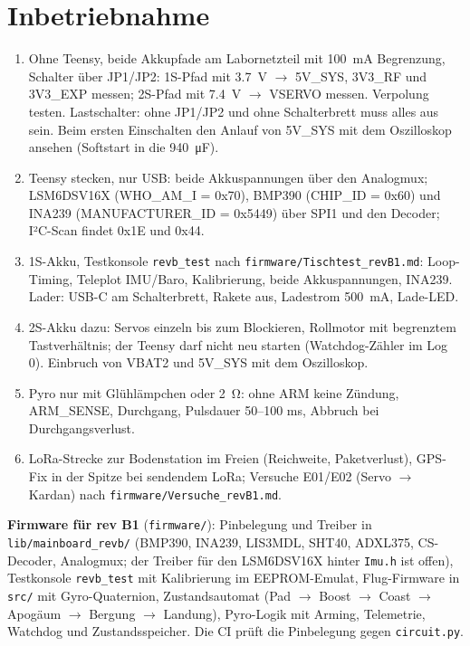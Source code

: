 \documentclass[10pt,a4paper,twoside]{article}
\begin{document}
\section{Inbetriebnahme}
\begin{enumerate}
  \item Ohne Teensy, beide Akkupfade am Labornetzteil mit \SI{100}{mA} Begrenzung, Schalter über JP1/JP2: 1S-Pfad mit \SI{3.7}{V} $\to$ 5V\_SYS, 3V3\_RF und 3V3\_EXP messen; 2S-Pfad mit \SI{7.4}{V} $\to$ VSERVO messen. Verpolung testen. Lastschalter: ohne JP1/JP2 und ohne Schalterbrett muss alles aus sein. Beim ersten Einschalten den Anlauf von 5V\_SYS mit dem Oszilloskop ansehen (Softstart in die \SI{940}{\micro F}).
  \item Teensy stecken, nur USB: beide Akkuspannungen über den Analogmux; LSM6DSV16X (WHO\_AM\_I = 0x70), BMP390 (CHIP\_ID = 0x60) und INA239 (MANUFACTURER\_ID = 0x5449) über SPI1 und den Decoder; I²C-Scan findet 0x1E und 0x44.
  \item 1S-Akku, Testkonsole \texttt{revb\_test} nach \texttt{firmware/Tischtest\_revB1.md}: Loop-Timing, Teleplot IMU/Baro, Kalibrierung, beide Akkuspannungen, INA239. Lader: USB-C am Schalterbrett, Rakete aus, Ladestrom \SI{500}{mA}, Lade-LED.
  \item 2S-Akku dazu: Servos einzeln bis zum Blockieren, Rollmotor mit begrenztem Tastverhältnis; der Teensy darf nicht neu starten (Watchdog-Zähler im Log 0). Einbruch von VBAT2 und 5V\_SYS mit dem Oszilloskop.
  \item Pyro nur mit Glühlämpchen oder \SI{2}{\ohm}: ohne ARM keine Zündung, ARM\_SENSE, Durchgang, Pulsdauer 50--100 ms, Abbruch bei Durchgangsverlust.
  \item LoRa-Strecke zur Bodenstation im Freien (Reichweite, Paketverlust), GPS-Fix in der Spitze bei sendendem LoRa; Versuche E01/E02 (Servo $\to$ Kardan) nach \texttt{firmware/Versuche\_revB1.md}.
\end{enumerate}

\textbf{Firmware für rev B1} (\texttt{firmware/}): Pinbelegung und Treiber in \texttt{lib/mainboard\_revb/} (BMP390, INA239, LIS3MDL, SHT40, ADXL375, CS-Decoder, Analogmux; der Treiber für den LSM6DSV16X hinter \texttt{Imu.h} ist offen), Testkonsole \texttt{revb\_test} mit Kalibrierung im EEPROM-Emulat, Flug-Firmware in \texttt{src/} mit Gyro-Quaternion, Zustandsautomat (Pad $\to$ Boost $\to$ Coast $\to$ Apogäum $\to$ Bergung $\to$ Landung), Pyro-Logik mit Arming, Telemetrie, Watchdog und Zustandsspeicher. Die CI prüft die Pinbelegung gegen \texttt{circuit.py}.
\end{document}
